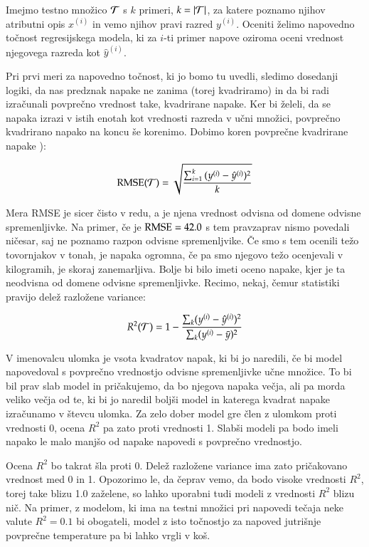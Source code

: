 Imejmo testno množico $\cal{T}$ s $k$ primeri, $k=|\cal{T}|$, za katere poznamo njihov atributni opis $x^{(i)}$ in vemo njihov pravi razred $y^{(i)}$. Oceniti želimo napovedno točnost regresijskega modela, ki za $i$-ti primer napove oziroma oceni vrednost njegovega razreda kot $\hat{y}^{(i)}$.

Pri prvi meri za napovedno točnost, ki jo bomo tu uvedli, sledimo dosedanji logiki, da nas predznak napake ne zanima (torej kvadriramo) in da bi radi izračunali povprečno vrednost take, kvadrirane napake. Ker bi želeli, da se napaka izrazi v istih enotah kot vrednosti razreda v učni množici, povprečno kvadrirano napako na koncu še korenimo. Dobimo koren povprečne kvadrirane napake ):

$$ {\rm RMSE}(\cal{T})=\sqrt{\sum_{i=1}^k{(y^{(i)}-\hat{y}^{(i)})^2}\over k} $$

Mera RMSE je sicer čisto v redu, a je njena vrednost odvisna od domene odvisne spremenljivke. Na primer, če je ${\rm RMSE}=42.0$ s tem pravzaprav nismo povedali ničesar, saj ne poznamo razpon odvisne spremenljvike. Če smo s tem ocenili težo tovornjakov v tonah, je napaka ogromna, če pa smo njegovo težo ocenjevali v kilogramih, je skoraj zanemarljiva. Bolje bi bilo imeti oceno napake, kjer je ta neodvisna od domene odvisne spremenljivke. Recimo, nekaj, čemur statistiki pravijo delež razložene variance:

$$ R^2({\cal T})=1-{\sum_k (y^{(i)}-\hat{y}^{(i)})^2
  \over \sum_k(y^{(i)}-\bar{y})^2} $$

V imenovalcu ulomka je vsota kvadratov napak, ki bi jo naredili, če bi model napovedoval s povprečno vrednostjo odvisne spremenljivke učne množice. To bi bil prav slab model in pričakujemo, da bo njegova napaka večja, ali pa morda veliko večja od te, ki bi jo naredil boljši model in katerega kvadrat napake izračunamo v števcu ulomka. Za zelo dober model gre člen z ulomkom proti vrednosti 0, ocena $R^2$ pa zato proti vrednosti 1. Slabši modeli pa bodo imeli napako le malo manjšo od napake napovedi s povprečno vrednostjo.

Ocena $R^2$ bo takrat šla proti 0. Delež razložene variance ima zato pričakovano vrednost med 0 in 1. Opozorimo le, da čeprav vemo, da bodo visoke vrednosti $R^2$, torej take blizu 1.0 zaželene, so lahko uporabni tudi modeli z vrednosti $R^2$ blizu nič. Na primer, z modelom, ki ima na testni množici pri napovedi tečaja neke valute $R^2=0.1$ bi obogateli, model z isto točnostjo za napoved jutrišnje povprečne temperature pa bi lahko vrgli v koš.

